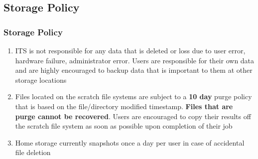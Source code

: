 \subsection{Storage Policy}
\begin{frame}
\frametitle{Storage Policy}
\begin{enumerate}
\item ITS is not responsible for any data that is deleted or loss due to user error, hardware failure, administrator error.  Users are responsible for their own data and are highly encouraged to backup data that is important to them at other storage locations
\item Files located on the scratch file systems are subject to a \textbf{10 day} purge policy that is based on the file/directory modified timestamp.  \textbf{Files that are purge cannot be recovered}.  Users are encouraged to copy their results off the scratch file system as soon as possible upon completion of their job
\item  Home storage currently snapshots once a day per user in case of accidental file deletion
\end{enumerate}
\end{frame}



